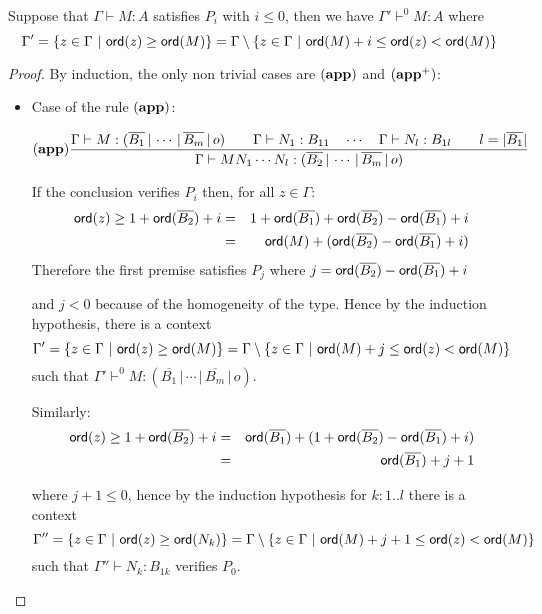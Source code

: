 \begin{lem}
\label{lem:restriction}

Suppose that $\Gamma \vdash M : A$ satisfies $P_i$ with $i\leq0$, then we have
$\Gamma' \vdash^{0} M : A$ where $$\Gamma' = \{ z \in \Gamma \ |
\ \ord{z} \geq \ord{M} \} = \Gamma \setminus \{ z \in \Gamma \ | \ \ord{M} + i \leq \ord{z} < \ord{M} \}$$
\end{lem}
\begin{proof}
By induction, the only non trivial cases are $\mathbf{(app)}$ and $\mathbf{(app^+)}$:
\begin{itemize}
\item Case of the rule $\mathbf{(app)}$:

    \[ (\mathbf{app})
    {{{{\Gamma} \vdash {M : (\overline{B_1} \, | \, \cdots \, | \, \overline{B_m} \, | \, o)}} \qquad
    {{\Gamma} \vdash {N_1 : B_{11}}} \quad \cdots \quad {{\Gamma} \vdash {N_{l} :
    B_{1l}}} \qquad l = |\overline{B_1}| } \over{ {{\Gamma} \vdash {M N_1
    \cdots N_{l} : (\overline{B_2} \, | \, \cdots \, | \,
    \overline{B_m} \, | \, o)}}}}
    \]

    If the conclusion verifies $P_i$ then, for all $z \in \Gamma$:
    \begin{eqnarray*}
    {\sf ord}(z) \geq 1 + {\sf ord}(\overline{B_2}) + i
    &=& 1 + {\sf ord}(\overline{B_1}) + {\sf ord}(\overline{B_2}) - {\sf ord}(\overline{B_1}) + i \\
    &=& {\sf ord}(M) + ({\sf ord}(\overline{B_2}) - {\sf ord}(\overline{B_1}) + i)
    \end{eqnarray*}
    Therefore the first premise satisfies $P_j$ where $j={{\sf ord}(\overline{B_2}) - {\sf ord}(\overline{B_1}) + i}$

    and $j< 0$ because of the homogeneity of the type. Hence by the induction hypothesis,
    there is a context $$\Gamma' = \{ z \in \Gamma \ |
    \ \ord{z} \geq \ord{M} \} = \Gamma \setminus \{ z \in \Gamma \ | \ \ord{M} + j \leq \ord{z} < \ord{M} \}$$
    such that $\Gamma' \vdash^{0} M : (\overline{B_1} \, | \, \cdots \, | \, \overline{B_m} \, | \, o)$.


    Similarly:
    \begin{eqnarray*}
    {\sf ord}(z) \geq 1 + {\sf ord}(\overline{B_2}) + i
    &=& {\sf ord}(\overline{B_1}) + (1+{\sf ord}(\overline{B_2}) - {\sf ord}(\overline{B_1}) + i) \\
    &=& {\sf ord}(\overline{B_1}) + j+1
    \end{eqnarray*}

    where $j+1\leq 0$, hence by the induction hypothesis for $k : 1..l$ there is a
    context $$\Gamma'' = \{ z \in \Gamma \ |
    \ \ord{z} \geq \ord{N_k} \} = \Gamma \setminus \{ z \in \Gamma \ | \ \ord{M} + j+1 \leq \ord{z} < \ord{M} \}$$
    such that $\Gamma'' \vdash N_k : B_{1k}$ verifies $P_0$.


\end{itemize}
\end{proof}

